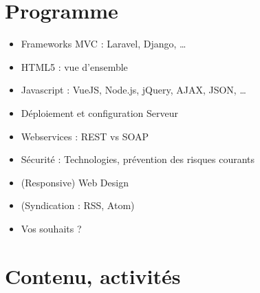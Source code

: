 \hypertarget{programme}{%
\section{Programme}\label{programme}}

\begin{itemize}
\tightlist
\item
  Frameworks MVC : Laravel, Django, \ldots{}
\item
  HTML5 : vue d'ensemble
\item
  Javascript : VueJS, Node.js, jQuery, AJAX, JSON, \ldots{}
\item
  Déploiement et configuration Serveur
\item
  Webservices : REST vs SOAP
\item
  Sécurité : Technologies, prévention des risques courants
\item
  (Responsive) Web Design
\item
  (Syndication : RSS, Atom)
\item
  {Vos souhaits ?}
\end{itemize}

\hypertarget{contenu-activituxe9s}{%
\section{Contenu, activités}\label{contenu-activituxe9s}}

